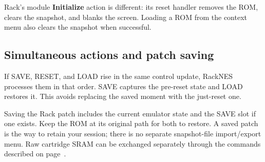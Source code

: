 Rack's module \textbf{Initialize} action is different: its reset handler
removes the ROM, clears the snapshot, and blanks the screen. Loading a ROM
from the context menu also clears the snapshot when successful.

\subsection{Simultaneous actions and patch saving}
If SAVE, RESET, and LOAD rise in the same control update, RackNES processes
them in that order. SAVE captures the pre-reset state and LOAD restores it.
This avoids replacing the saved moment with the just-reset one.

Saving the Rack patch includes the current emulator state and the SAVE slot
if one exists. Keep the ROM at its original path for both to restore.
A saved patch is the way to retain your session; there is no separate
snapshot-file import/export menu. Raw cartridge SRAM can be exchanged
separately through the commands described on page~\pageref{sec:sram}.
